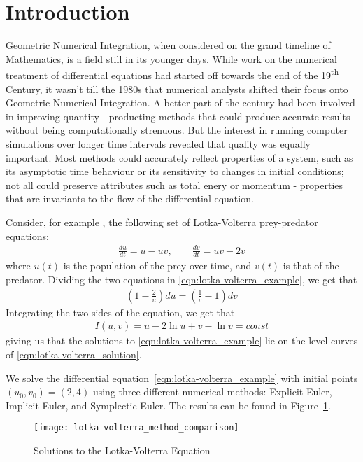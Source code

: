\documentclass[../Main.tex]{subfiles}
\begin{document}
\section{Introduction}

Geometric Numerical Integration, when considered on the grand timeline of Mathematics, is a field still in its younger days. While work on the numerical treatment of differential equations had started off towards the end of the 19\textsuperscript{th} Century, it wasn't till the 1980s that numerical analysts shifted their focus onto Geometric Numerical Integration.  A  better part of the century had been involved in improving quantity -  producting methods that could produce accurate results without being computationally strenuous. But the interest in running computer simulations over longer time intervals revealed that quality was equally important. Most methods could accurately reflect properties of a system, such as its asymptotic time behaviour or its sensitivity to changes in initial conditions; not all could preserve attributes such as total enery or momentum - properties that are invariants to the flow of the differential equation.

Consider, for example \cite{Hairer2006}, the following set of Lotka-Volterra prey-predator equations:
\begin{align}
	\frac{du}{dt} = u - uv, \qquad \frac{dv}{dt} = uv - 2v \label{eqn:lotka-volterra_example}
\end{align} where $u(t)$ is the population of the prey over time, and $v(t)$ is that of the predator. Dividing the two equations in \ref{eqn:lotka-volterra_example}, we get that
\begin{align*}
\left(1 -  \frac{2}{u}\right) du = \left(\frac{1}{v} - 1\right) dv
\end{align*}
Integrating the two sides of the equation, we get that
\begin{align}
I(u, v) = u - 2\ln{u} +  v - \ln{v} = const \label{eqn:lotka-volterra_solution}
\end{align}
giving us that the solutions to \ref{eqn:lotka-volterra_example} lie on the level curves of \ref{eqn:lotka-volterra_solution}.

We solve the differential equation~\ref{eqn:lotka-volterra_example} with initial points $(u_0, v_0) = (2, 4)$ using three different numerical methods: Explicit Euler, Implicit Euler, and Symplectic Euler. The results can be found in Figure~\ref{fig:lotka-volterra_solutions}. 
\begin{figure}[H]
\texttt{[image: lotka-volterra\_method\_comparison]}
\centering
\caption{Solutions to the Lotka-Volterra Equation}
\label{fig:lotka-volterra_solutions}
\end{figure}
\end{document}
